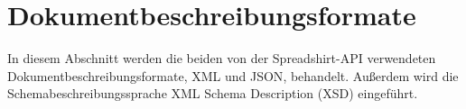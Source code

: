\section{Dokumentbeschreibungsformate}
\label{sec:document_description_formats}

In diesem Abschnitt werden die beiden von der Spreadshirt-\gls{API} verwendeten Dokumentbeschreibungsformate, \gls{XML} und \gls{JSON}, behandelt. Außerdem wird die Schemabeschreibungssprache \gls{XML} Schema Description (\gls{XSD}) eingeführt.






